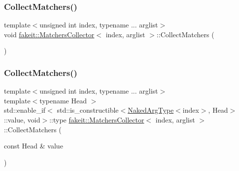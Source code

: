 \mbox{\label{classfakeit_1_1MatchersCollector_a2d9a08a347c3915daa33f307a274f13c}} 
\subsubsection{\texorpdfstring{CollectMatchers()}{CollectMatchers()}\hspace{0.1cm}{\footnotesize\ttfamily [11/63]}}
{\footnotesize\ttfamily template$<$unsigned int index, typename ... arglist$>$ \\
void \mbox{\hyperlink{classfakeit_1_1MatchersCollector}{fakeit\+::\+Matchers\+Collector}}$<$ index, arglist $>$\+::Collect\+Matchers (\begin{DoxyParamCaption}{ }\end{DoxyParamCaption})\hspace{0.3cm}{\ttfamily [inline]}}

\mbox{\label{classfakeit_1_1MatchersCollector_affd243a89f758239d77c70dce6318087}} 
\subsubsection{\texorpdfstring{CollectMatchers()}{CollectMatchers()}\hspace{0.1cm}{\footnotesize\ttfamily [12/63]}}
{\footnotesize\ttfamily template$<$unsigned int index, typename ... arglist$>$ \\
template$<$typename Head $>$ \\
std\+::enable\+\_\+if$<$ std\+::is\+\_\+constructible$<$\mbox{\hyperlink{classfakeit_1_1MatchersCollector_aeda8ced6a2f0cb7c6e4f916f18a91730}{Naked\+Arg\+Type}}$<$index$>$, Head$>$\+::value, void$>$\+::type \mbox{\hyperlink{classfakeit_1_1MatchersCollector}{fakeit\+::\+Matchers\+Collector}}$<$ index, arglist $>$\+::Collect\+Matchers (\begin{DoxyParamCaption}\item[{const Head \&}]{value }\end{DoxyParamCaption})\hspace{0.3cm}{\ttfamily [inline]}}

